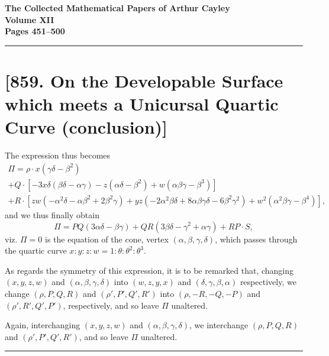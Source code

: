 \documentclass[11pt,a4paper]{article}
\theoremstyle{definition}
\begin{document}
\begin{center}
\Large\textbf{The Collected Mathematical Papers of Arthur Cayley}\\[6pt]
\large\textbf{Volume XII}\\[12pt]
\normalsize\textbf{Pages 451--500}
\end{center}

\hrule
\vspace{12pt}

\section*{[859. On the Developable Surface which meets a Unicursal Quartic Curve (conclusion)]}

The expression thus becomes
\begin{multline*}
\Pi = \rho \cdot x(\gamma\delta - \beta^2) \\
+ Q \cdot [-3x\delta(\beta\delta - \alpha\gamma) - z(\alpha\delta - \beta^2) + w(\alpha\beta\gamma - \beta^3)] \\
+ R \cdot [zw(-\alpha^2\delta - \alpha\beta^2 + 2\beta^2\gamma)
+ yz(-2\alpha^2\beta\delta + 8\alpha\beta\gamma\delta - 6\beta^2\gamma^2)
+ w^2(\alpha^2\beta\gamma - \beta^4)],
\end{multline*}
and we thus finally obtain
\[
\Pi = PQ(3\alpha\delta - \beta\gamma) + QR(3\beta\delta - \gamma^2 + \alpha\gamma) + RP \cdot S,
\]
viz. $\Pi = 0$ is the equation of the cone, vertex $(\alpha, \beta, \gamma, \delta)$, which passes through the quartic curve $x : y : z : w = 1 : \theta : \theta^2 : \theta^3$.

As regards the symmetry of this expression, it is to be remarked that, changing $(x, y, z, w)$ and $(\alpha, \beta, \gamma, \delta)$ into $(w, z, y, x)$ and $(\delta, \gamma, \beta, \alpha)$ respectively, we change $(\rho, P, Q, R)$ and $(\rho', P', Q', R')$ into $(\rho, -R, -Q, -P)$ and $(\rho', R', Q', P')$, respectively, and so leave $\Pi$ unaltered.

Again, interchanging $(x, y, z, w)$ and $(\alpha, \beta, \gamma, \delta)$, we interchange $(\rho, P, Q, R)$ and $(\rho', P', Q', R')$, and so leave $\Pi$ unaltered.

\vspace{12pt}
\hrule
\vspace{12pt}
\end{document}

